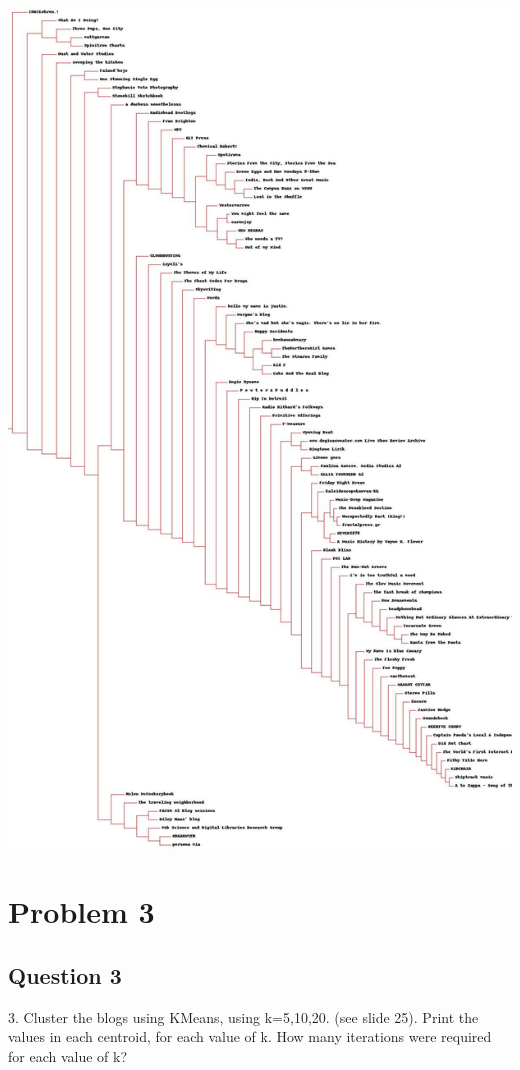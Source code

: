 \documentclass[10pt,letterpaper]{article}
\begin{document}
\includegraphics[scale=.2]{blogclust.jpg}  
\pagebreak
\section{Problem 3}
\subsection{Question 3}
3.  Cluster the blogs using K\-Means, using k{=}5,10,20. (see slide 25).  Print the values in each centroid, for each value of k.  How many iterations were required for each value of k{?}\\
\\
\end{document}
